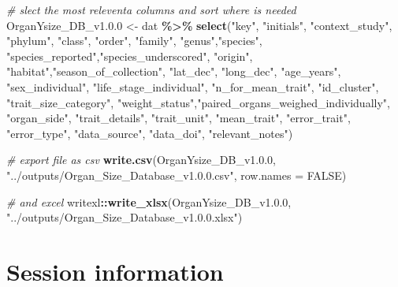 \documentclass[
]{article}
\newenvironment{Shaded}{\begin{snugshade}}{\end{snugshade}}
\newcommand{\AttributeTok}[1]{\textcolor[rgb]{0.13,0.29,0.53}{#1}}
\newcommand{\CommentTok}[1]{\textcolor[rgb]{0.56,0.35,0.01}{\textit{#1}}}
\newcommand{\ConstantTok}[1]{\textcolor[rgb]{0.56,0.35,0.01}{#1}}
\newcommand{\FloatTok}[1]{\textcolor[rgb]{0.00,0.00,0.81}{#1}}
\newcommand{\FunctionTok}[1]{\textcolor[rgb]{0.13,0.29,0.53}{\textbf{#1}}}
\newcommand{\NormalTok}[1]{#1}
\newcommand{\OtherTok}[1]{\textcolor[rgb]{0.56,0.35,0.01}{#1}}
\newcommand{\SpecialCharTok}[1]{\textcolor[rgb]{0.81,0.36,0.00}{\textbf{#1}}}
\newcommand{\StringTok}[1]{\textcolor[rgb]{0.31,0.60,0.02}{#1}}
\begin{document}
\begin{Shaded}
\begin{Highlighting}[]
\CommentTok{\# slect the most releventa columns and sort where is needed}
\NormalTok{OrganYsize\_DB\_v1.}\FloatTok{0.0} \OtherTok{\textless{}{-}}\NormalTok{ dat }\SpecialCharTok{\%\textgreater{}\%} 
  \FunctionTok{select}\NormalTok{(}\StringTok{"key"}\NormalTok{,}
         \StringTok{"initials"}\NormalTok{, }\StringTok{"context\_study"}\NormalTok{,}
         \StringTok{"phylum"}\NormalTok{, }\StringTok{"class"}\NormalTok{, }\StringTok{"order"}\NormalTok{, }\StringTok{"family"}\NormalTok{, }\StringTok{"genus"}\NormalTok{,}\StringTok{"species"}\NormalTok{, }
         \StringTok{"species\_reported"}\NormalTok{,}\StringTok{"species\_underscored"}\NormalTok{,}
         \StringTok{"origin"}\NormalTok{, }\StringTok{"habitat"}\NormalTok{,}\StringTok{"season\_of\_collection"}\NormalTok{,}
         \StringTok{"lat\_dec"}\NormalTok{,}
         \StringTok{"long\_dec"}\NormalTok{,}
         \StringTok{"age\_years"}\NormalTok{,}
         \StringTok{"sex\_individual"}\NormalTok{, }\StringTok{"life\_stage\_individual"}\NormalTok{, }\StringTok{"n\_for\_mean\_trait"}\NormalTok{,}
         \StringTok{"id\_cluster"}\NormalTok{, }\StringTok{"trait\_size\_category"}\NormalTok{, }
         \StringTok{"weight\_status"}\NormalTok{,}\StringTok{"paired\_organs\_weighed\_individually"}\NormalTok{, }\StringTok{"organ\_side"}\NormalTok{, }\StringTok{"trait\_details"}\NormalTok{, }\StringTok{"trait\_unit"}\NormalTok{, }
         \StringTok{"mean\_trait"}\NormalTok{, }\StringTok{"error\_trait"}\NormalTok{, }\StringTok{"error\_type"}\NormalTok{, }
         \StringTok{"data\_source"}\NormalTok{, }\StringTok{"data\_doi"}\NormalTok{,}
         \StringTok{"relevant\_notes"}\NormalTok{)}

\CommentTok{\# export file as csv}
\FunctionTok{write.csv}\NormalTok{(OrganYsize\_DB\_v1.}\FloatTok{0.0}\NormalTok{, }\StringTok{"../outputs/Organ\_Size\_Database\_v1.0.0.csv"}\NormalTok{, }\AttributeTok{row.names =} \ConstantTok{FALSE}\NormalTok{)}

\CommentTok{\#  and excel}
\NormalTok{writexl}\SpecialCharTok{::}\FunctionTok{write\_xlsx}\NormalTok{(OrganYsize\_DB\_v1.}\FloatTok{0.0}\NormalTok{, }\StringTok{"../outputs/Organ\_Size\_Database\_v1.0.0.xlsx"}\NormalTok{)}
\end{Highlighting}
\end{Shaded}

\section{Session information}\label{session-information}
\end{document}
